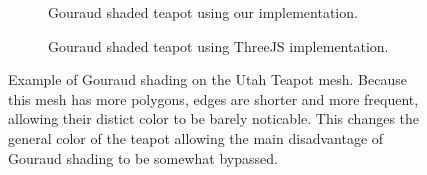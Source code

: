 \documentclass[10pt,twocolumn,letterpaper]{article}
\begin{document}
\begin{figure}
    \centering
    \begin{subfigure}{.48\linewidth}
        \caption{Gouraud shaded teapot using our implementation.}
        \label{fig:our-gouraud-tea}
    \end{subfigure}
    \hfill
    \begin{subfigure}{.48\linewidth}
        \caption{Gouraud shaded teapot using ThreeJS implementation.}
        \label{fig:three-gouraud-tea}
    \end{subfigure}
    \caption{Example of Gouraud shading on the Utah Teapot mesh. Because this mesh has more polygons, edges are shorter and more frequent, allowing their distict color to be barely noticable. This changes the general color of the teapot allowing the main disadvantage of Gouraud shading to be somewhat bypassed.}
    \label{fig:gouraud-tea}
\end{figure}
\end{document}
